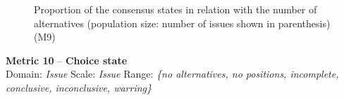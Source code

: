 \documentclass[article]{elsarticle}
\begin{document}
\begin{figure}
\begin{center}

  \caption{Proportion of the consensus states in relation with the number of alternatives (population size: number of issues shown in parenthesis)(M9)}
  \label{fig:M9}
  \end{center}
\end{figure}

\clearpage
\noindent
\textbf{Metric 10} -- \textbf{Choice state}\\
Domain: \emph{Issue} Scale: \emph{Issue} Range: \emph{\{no alternatives, no positions, incomplete, conclusive, inconclusive, warring\}}
\end{document}
